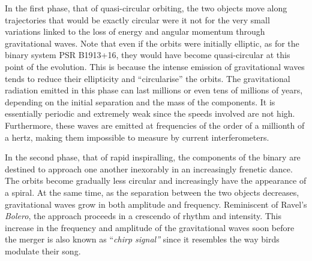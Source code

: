 In the first phase, that of quasi-circular orbiting, the two objects move along
trajectories that would be exactly circular were it not for the very small variations
linked to the loss of energy and angular momentum through gravitational waves. Note that
even if the orbits were initially elliptic, as for the binary system PSR
B1913+16, they would have become quasi-circular at this point of the
evolution. This is because the intense emission of gravitational waves tends to reduce
their ellipticity and ``circularise'' the orbits. The gravitational
radiation emitted in this phase can last millions
or even tens of millions of years, depending on the initial separation and the mass of
the components. It is essentially periodic and extremely weak since the speeds involved
are not high. Furthermore, these waves are emitted at frequencies of the order of a
millionth of a hertz, making them impossible to measure by current interferometers.

In the second phase, that of rapid inspiralling, the components of the binary are
destined to approach one another inexorably in an increasingly frenetic dance. The
orbits become gradually less circular and increasingly have the appearance of a spiral.
At the same time, as the separation between the two objects decreases, gravitational
waves grow in both amplitude and frequency. Reminiscent of Ravel's \emph{Bolero}, the
approach proceeds in a crescendo of rhythm and intensity. This increase in the frequency
and amplitude of the gravitational waves soon before the merger is also known as
``\emph{chirp signal''} since it resembles the way birds modulate their song.

